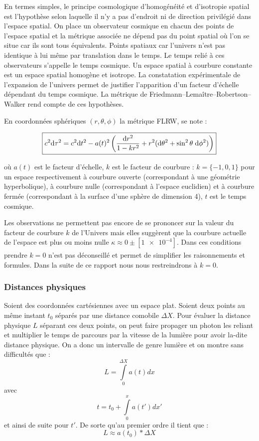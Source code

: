 \documentclass[10pt, a4paper]{report}
\numberwithin{equation}{subsection}
\begin{document}
En termes simples, le principe cosmologique d'homogénéité et d'isotropie spatial est l'hypothèse selon laquelle il n'y a pas d'endroit ni de direction privilégié dans l'espace spatial. On place un observateur cosmique en chacun des points de l'espace spatial et la métrique associée ne dépend pas du point spatial où l'on se situe car ils sont tous équivalents. Points spatiaux car l'univers n'est pas identique à lui même par translation dans le temps. Le temps relié à ces observateurs s'appelle le temps cosmique. Un espace spatial à courbure constante est un espace spatial homogène et isotrope.  La constatation expérimentale de l'expansion de l'univers permet de justifier l'apparition d'un facteur d'échelle dépendant du temps cosmique. La métrique de Friedmann–Lemaître–Robertson–Walker rend compte de ces hypothèses.

En coordonnées sphériques $(r, \theta, \phi)$ la métrique FLRW, se note :

\begin{equation}
\boxed{ c^2 {\rm d}\tau^2 = c^2 {\rm d}t^2 - a(t)^2 \left (\frac{{\rm d}r^2}{1 - k r^2} + r^2 ({\rm d}\theta^2 + \sin^2 \theta \; {\rm d} \phi^2) \right )}
\end{equation}

où $a(t)$ est le facteur d'échelle, $k$ est le facteur de courbure : $k = \{-1,0,1\}$ pour un espace respectivement à courbure ouverte (correspondant à une géométrie hyperbolique), à courbure nulle (correspondant à l'espace euclidien) et à courbure fermée (correspondant à la surface d'une sphère de dimension 4), $t$ est le temps cosmique.

Les observations ne permettent pas encore de se prononcer sur la valeur du facteur de courbure $k$ de l'Univers mais elles suggèrent que la courbure actuelle de l'espace est plus ou moins nulle $ \kappa \approx 0 \pm [\num{1e-4}]$. Dans ces conditions prendre $k=0$ n'est pas déconseillé\textsuperscript{\cite{Weinberg}} et permet de simplifier les raisonnements et formules. Dans la suite de ce rapport nous nous restreindrons à $k=0$. 
\subsubsection{Distances physiques}
Soient des coordonnées cartésiennes avec un espace plat. Soient deux points au même instant $t_0$ séparés par une distance comobile $\Delta X$. Pour évaluer la distance physique $L$ séparant ces deux points, on peut faire propager un photon les reliant et multiplier le temps de parcours par la vitesse de la lumière pour avoir la-dite distance physique. On a donc un intervalle de genre lumière et on montre sans difficultés que :
\begin{equation}
\boxed{ L=\int\limits_0^{\Delta X} a(t)dx}
\end{equation}
avec \begin{equation}
\boxed{ t=t_0 + \int\limits_0^x a(t')dx'}
\end{equation}
et ainsi de suite pour $t'$.
De sorte qu'au premier ordre il tient que :
\begin{equation} \label{eq:foL}
\boxed{ L \approx a(t_0) * \Delta X}
\end{equation}
\end{document}
